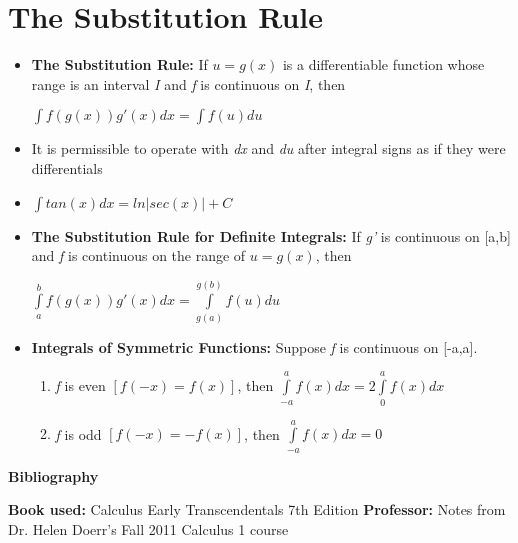 \documentclass{report}
\begin{document}
		\section{The Substitution Rule}
			\begin{itemize}\addtolength{\leftskip}{2em}
				\item \textbf{The Substitution Rule: }If $u=g(x)$ is a differentiable function whose range is an interval \textit{I} and \textit{f} is continuous on \textit{I}, then
				\begin{center}
				$\int f(g(x))g'(x)dx=\int f(u)du$
				\end{center}
				\item It is permissible to operate with \textit{dx} and \textit{du} after integral signs as if they were differentials
				\item $\int tan(x)dx=ln|sec(x)|+C$
				\item \textbf{The Substitution Rule for Definite Integrals: }If \textit{g'} is continuous on [a,b] and \textit{f} is continuous on the range of $u=g(x)$, then
				\begin{center}
				$\int\limits_{a}^{b}f(g(x))g'(x)dx=\int\limits_{g(a)}^{g(b)}f(u)du$
				\end{center}
				\item \textbf{Integrals of Symmetric Functions:} Suppose \textit{f} is continuous on [-a,a].
				\begin{enumerate}\addtolength{\leftskip}{4em}
					\item \textit{f} is even $[f(-x)=f(x)]$, then $\int\limits_{-a}^{a}f(x)dx=2\int\limits_{0}^{a}f(x)dx$
					\item \textit{f} is odd $[f(-x)=-f(x)]$, then $\int\limits_{-a}^{a}f(x)dx=0$
				\end{enumerate}
			\end{itemize}
	\begin{center}
	\newpage
	\textbf{\huge{Bibliography}}
	\end{center}
	\textbf{Book used:} Calculus Early Transcendentals 7th Edition\newline
	\textbf{Professor:} Notes from Dr. Helen Doerr's Fall 2011 Calculus 1 course
\end{document}
